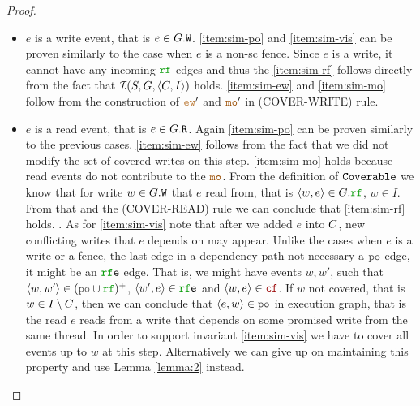 \documentclass[12pt]{article}
\begin{document}
\begin{proof}
\begin{itemize}
    \item $e$ is a write event, that is $e \in G.{\mathtt{W}}$.
      \ref{item:sim-po} and \ref{item:sim-vis} can be proven similarly 
      to the case when $e$ is a non-sc fence.
      Since $e$ is a write, it cannot have any incoming $\lRF$ edges and thus
      the \ref{item:sim-rf} follows directly from 
      the fact that $\mathcal{I}(S, G, \langle C, I \rangle)$ holds.
      \ref{item:sim-ew} and \ref{item:sim-mo} follow from the construction
      of $\lEW'$ and $\lMO'$ in (COVER-WRITE) rule.
      
    \item $e$ is a read event, that is $e \in G.{\mathtt{R}}$.
      Again \ref{item:sim-po} can be proven similarly to the previous cases.
      \ref{item:sim-ew} follows from the fact that
      we did not modify the set of covered writes on this step.
      \ref{item:sim-mo} holds because read events do not contribute to the $\lMO$.
      From the definition of ${\mathtt{Coverable}}$ we know that for write $w \in G.{\mathtt{W}}$
      that $e$ read from, that is $\tup{w, e} \in \lG.\lRF$, $w \in I$.
      From that and the (COVER-READ) rule we can conclude that \ref{item:sim-rf} holds.
      .
      As for \ref{item:sim-vis} note that after we added $e$ into $C$,
      new conflicting writes that $e$ depends on may appear.
      Unlike the cases when $e$ is a write or a fence,
      the last edge in a dependency path not necessary a $\lPO$ edge,
      it might be an $\lRFE$ edge.
      That is, we might have events $w, w'$, such that
      $\tup{w, w'} \in (\lPO \cup \lRF)^+$,
      $\tup{w', e} \in \lRFE$ and $\tup{w, e} \in \lCF$.
      If $w$ not covered, that is $w \in I \setminus C$,
      then we can conclude that $\tup{e, w} \in \lPO$ in execution graph,
      that is the read $e$ reads from a write that depends on some promised write
      from the same thread.
      In order to support invariant \ref{item:sim-vis} we have to
      cover all events up to $w$ at this step.
      Alternatively we can give up on maintaining this property
      and use Lemma \ref{lemma:2} instead.


  \end{itemize}
\end{proof}
\end{document}
